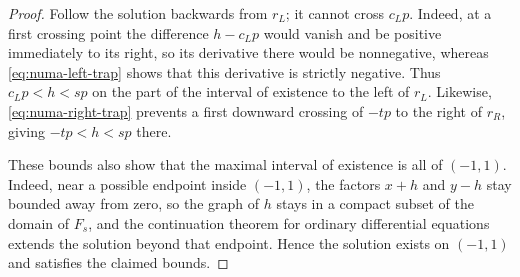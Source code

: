 \begin{proof}
Follow the solution backwards from $r_L$; it cannot cross $c_Lp$. Indeed, at a first crossing point the difference $h-c_Lp$ would vanish and be positive immediately to its right, so its derivative there would be nonnegative, whereas \eqref{eq:numa-left-trap} shows that this derivative is strictly negative. Thus $c_Lp<h<sp$ on the part of the interval of existence to the left of $r_L$. Likewise, \eqref{eq:numa-right-trap} prevents a first downward crossing of $-tp$ to the right of $r_R$, giving $-tp<h<sp$ there.

These bounds also show that the maximal interval of existence is all of $(-1,1)$. Indeed, near a possible endpoint inside $(-1,1)$, the factors $x+h$ and $y-h$ stay bounded away from zero, so the graph of $h$ stays in a compact subset of the domain of $F_s$, and the continuation theorem for ordinary differential equations extends the solution beyond that endpoint. Hence the solution exists on $(-1,1)$ and satisfies the claimed bounds.
\end{proof}

